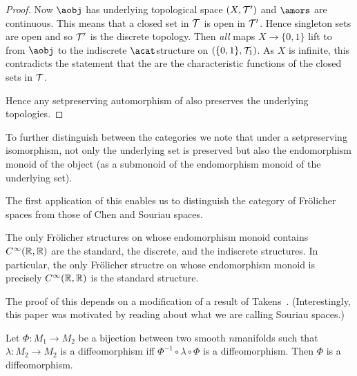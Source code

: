 \documentclass[%
12pt,%
arxiv,%
defaults
]{myclass}
\begin{document}
\begin{proof}
Now \(\aobj\) has underlying topological space \((X, \mathcal{T}')\) and \(\amors\) are continuous.
This means that a closed set in \(\mathcal{T}\) is open in \(\mathcal{T}'\).
Hence singleton sets are open and so \(\mathcal{T}'\) is the discrete topology.
Then \emph{all} maps \(X \to \{0,1\}\) lift to \amors from \(\aobj\) to the indiscrete \(\acat\)\enhyp{}structure on \((\{0,1\}, \mathcal{T}_1)\).
As \(X\) is infinite, this contradicts the statement that the \amors are the characteristic functions of the closed sets in \(\mathcal{T}\).

Hence any set\enhyp{}preserving automorphism of \acat also preserves the underlying topologies.
\end{proof}

To further distinguish between the categories we note that under a set\enhyp{}preserving isomorphism, not only the underlying set is preserved but also the endomorphism monoid of the object (as a submonoid of the endomorphism monoid of the underlying set).

The first application of this enables us to distinguish the category of Fr\"olicher spaces from those of Chen and Souriau spaces.

\begin{proposition}
\label{prop:uniquer}
The only Fr\"olicher structures on \R whose endomorphism monoid contains \(C^\infty(\mathbb{R},\mathbb{R})\) are the standard, the discrete, and the indiscrete structures.
In particular, the only Fr\"olicher structre on \R whose endomorphism monoid is precisely \(C^\infty(\mathbb{R},\mathbb{R})\) is the standard structure.
\end{proposition}

The proof of this depends on a modification of a result of Takens~\cite{ft}.
(Interestingly, this paper was motivated by reading about what we are calling Souriau spaces.)

\begin{theorem}{{\cite[Theorem~1]{ft}}}
Let \(\Phi \colon M_1 \to M_2\) be a bijection between two smooth \(n\)\enhyp{}manifolds such that \(\lambda \colon M_2 \to M_2\) is a diffeomorphism iff \(\Phi^{-1} \circ \lambda \circ \Phi\) is a diffeomorphism.
Then \(\Phi\) is a diffeomorphism. \noproof
\end{theorem}
\end{document}
